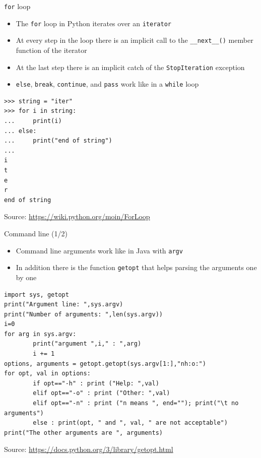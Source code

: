 \documentclass{beamer}
\begin{document}
\begin{frame}[fragile]
{\centerline{\texttt{for} loop}}
\begin{itemize}
    \item The \texttt{for} loop in Python iterates over an \texttt{iterator}
    \item At every step in the loop there is an implicit call to the \texttt{\_\_next\_\_()} member function of the iterator
    \item At the last step there is an implicit catch of the  \texttt{StopIteration} exception
    \item  \texttt{else}, \texttt{break},  \texttt{continue}, and  \texttt{pass} work like in a  \texttt{while} loop
     \end{itemize}
 \begin{lstlisting}[style=myPythonStyle]
>>> string = "iter"
>>> for i in string:
...     print(i)
... else:
...     print("end of string")
... 
i
t
e
r
end of string
\end{lstlisting}

\begin{center}
\tiny Source: \url{https://wiki.python.org/moin/ForLoop}
\end{center}

\end{frame}

\begin{frame}[fragile]
{\centerline{Command line (1/2)}}
\begin{itemize}
    \item Command line arguments work like in Java with \texttt{argv}
    \item In addition there is the function \texttt{getopt} that helps parsing the arguments one by one
     \end{itemize}
 \begin{lstlisting}[style=myPythonStyle]
import sys, getopt
print("Argument line: ",sys.argv)
print("Number of arguments: ",len(sys.argv))
i=0
for arg in sys.argv:
        print("argument ",i," : ",arg)
        i += 1
options, arguments = getopt.getopt(sys.argv[1:],"nh:o:")
for opt, val in options:
        if opt=="-h" : print ("Help: ",val)
        elif opt=="-o" : print ("Other: ",val)
        elif opt=="-n" : print ("n means ", end=""); print("\t no arguments")
        else : print(opt, " and ", val, " are not acceptable")
print("The other arguments are ", arguments)
\end{lstlisting}

\begin{center}
\tiny Source: \url{https://docs.python.org/3/library/getopt.html}
\end{center}

\end{frame}
\end{document}
